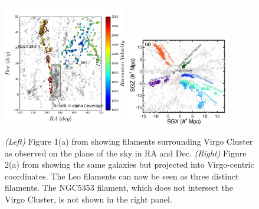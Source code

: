 \documentclass[12pt, preprint]{aastex}
\newcommand{\ha}{$H\alpha$}
\begin{document}
\begin{figure}[h]
\centering
\includegraphics[width=0.48\textwidth]{filaments.png}
\includegraphics[width=0.4\textwidth]{KimFig2a.png}
\caption{\small {\it (Left)} Figure 1(a) from \citet{kim16} showing filaments
  surrounding Virgo Cluster as observed on the plane of the sky in RA and Dec.  {\it (Right)} Figure
  2(a) from \citet{kim16} showing the same galaxies but projected into
Virgo-centric coordinates.  The Leo filaments can now be seen as three
distinct filaments.  The NGC5353 filament, which does not intersect
the Virgo Cluster, is not shown in the right panel.}
\label{kimfigure}
\end{figure}

\end{document}

